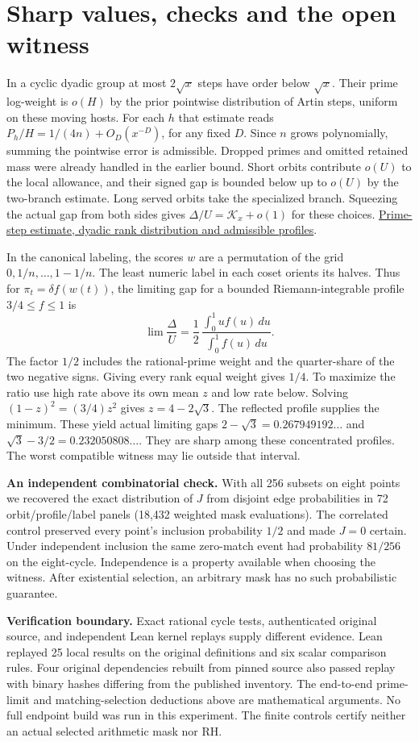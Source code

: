 \documentclass[12pt,letterpaper]{article}
\newcommand{\para}[1]{\par\medskip\noindent\textbf{#1}\quad}
\newcommand{\pagepart}[1]{\clearpage\section{#1}}
\begin{document}
\pagepart{Sharp values, checks and the open witness}
In a cyclic dyadic group at most \(2\sqrt x\) steps have order below \(\sqrt x\). Their prime log-weight is \(o(H)\) by the prior pointwise distribution of Artin steps, uniform on these moving hosts. For each \(h\) that estimate reads \(P_h/H=1/(4n)+O_D(x^{-D})\), for any fixed \(D\). Since \(n\) grows polynomially, summing the pointwise error is admissible. Dropped primes and omitted retained mass were already handled in the earlier bound. Short orbits contribute \(o(U)\) to the local allowance, and their signed gap is bounded below up to \(o(U)\) by the two-branch estimate. Long served orbits take the specialized branch. Squeezing the actual gap from both sides gives \(\Delta/U=\mathcal K_x+o(1)\) for these choices. \href{https://github.com/nousentllc/riemann-hypothesis/pull/10}{Prime-step estimate, dyadic rank distribution and admissible profiles}.

In the canonical labeling, the scores \(w\) are a permutation of the grid \(0,1/n,\dots,1-1/n\). The least numeric label in each coset orients its halves. Thus for \(\pi_t=\delta f(w(t))\), the limiting gap for a bounded Riemann-integrable profile \(3/4\le f\le1\) is
\[
 \lim\frac{\Delta}{U}=\frac12\,\frac{\int_0^1u f(u)\,du}{\int_0^1 f(u)\,du}.
\]
The factor \(1/2\) includes the rational-prime weight and the quarter-share of the two negative signs. Giving every rank equal weight gives \(1/4\). To maximize the ratio use high rate above its own mean \(z\) and low rate below. Solving \((1-z)^2=(3/4)z^2\) gives \(z=4-2\sqrt3\). The reflected profile supplies the minimum. These yield actual limiting gaps \(2-\sqrt3=0.267949192\ldots\) and \(\sqrt3-3/2=0.232050808\ldots\). They are sharp among these concentrated profiles. The worst compatible witness may lie outside that interval.

\para{An independent combinatorial check.} With all 256 subsets on eight points we recovered the exact distribution of \(J\) from disjoint edge probabilities in 72 orbit/profile/label panels (18,432 weighted mask evaluations). The correlated control preserved every point's inclusion probability \(1/2\) and made \(J=0\) certain. Under independent inclusion the same zero-match event had probability \(81/256\) on the eight-cycle. Independence is a property available when choosing the witness. After existential selection, an arbitrary mask has no such probabilistic guarantee.

\para{Verification boundary.} Exact rational cycle tests, authenticated original source, and independent Lean kernel replays supply different evidence. Lean replayed 25 local results on the original definitions and six scalar comparison rules. Four original dependencies rebuilt from pinned source also passed replay with binary hashes differing from the published inventory. The end-to-end prime-limit and matching-selection deductions above are mathematical arguments. No full endpoint build was run in this experiment. The finite controls certify neither an actual selected arithmetic mask nor RH.
\end{document}
